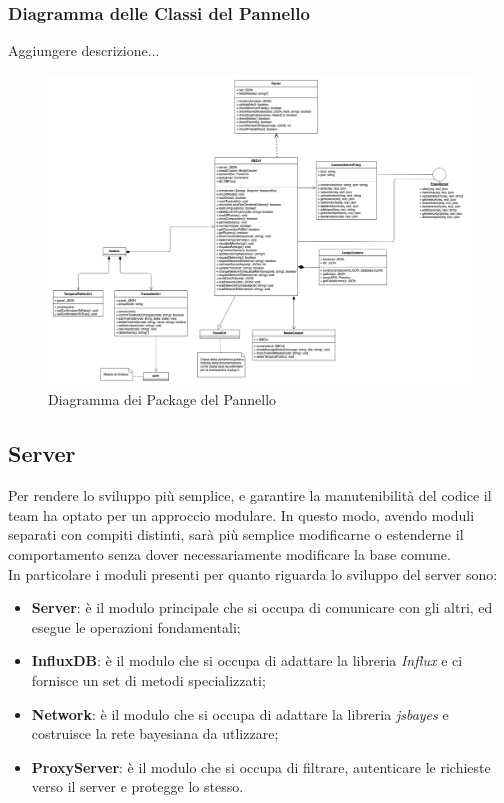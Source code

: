 \subsubsection{Diagramma delle Classi del Pannello}
Aggiungere descrizione...
\begin{figure}[H]
\begin{center}
	\includegraphics[scale=0.6]{./images/panelClassi.png} 
\end{center}
\caption{Diagramma dei Package del Pannello}
\end{figure}

\subsection{Server}\label{archServer}
Per rendere lo sviluppo più semplice, e garantire la manutenibilità del codice il team ha optato per un approccio modulare. In questo modo, avendo moduli separati con compiti distinti, sarà più semplice modificarne o estenderne il comportamento senza dover necessariamente modificare la base comune.\\
In particolare i moduli presenti per quanto riguarda lo sviluppo del server sono:
\begin{itemize}
	\item \textbf{Server}: è il modulo principale che si occupa di comunicare con gli altri, ed esegue le operazioni fondamentali;
	\item \textbf{InfluxDB}: è il modulo che si occupa di adattare la libreria \textit{Influx} e ci fornisce un set di metodi specializzati;
	\item \textbf{Network}: è il modulo che si occupa di adattare la libreria \textit{jsbayes} e costruisce la rete bayesiana da utlizzare;
	\item \textbf{ProxyServer}: è il modulo che si occupa di filtrare, autenticare le richieste verso il server e  protegge lo stesso.
\end{itemize}

